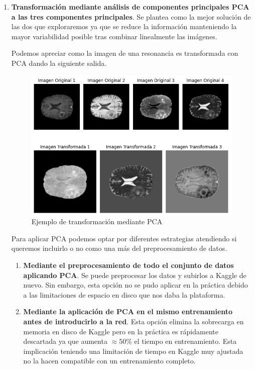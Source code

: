 \begin{enumerate}
	\item \textbf{Transformación mediante análisis de componentes principales PCA a las tres componentes principales}. Se plantea como la mejor solución de las dos que exploraremos ya que se reduce la información manteniendo la mayor variabilidad posible tras combinar linealmente las imágenes. 
	
	Podemos apreciar como la imagen de una resonancia es transformada con PCA dando la siguiente salida.
	
	\begin{figure}[H]
		\centering
		\includegraphics[width=0.8\linewidth]{imagenes/PCA_reduction.png}
		\caption{Ejemplo de transformación mediante PCA}
	\end{figure}
	
	Para aplicar PCA podemos optar por diferentes estrategias atendiendo si queremos incluirlo o no como una más del preprocesamiento de datos.
	
	\begin{enumerate}
		\item \textbf{Mediante el preprocesamiento de todo el conjunto de datos aplicando PCA}. Se puede preprocesar los datos y subirlos a Kaggle de nuevo. Sin embargo, esta opción no se pudo aplicar en la práctica debido a las limitaciones de espacio en disco que nos daba la plataforma.
		
		\item \textbf{Mediante la aplicación de PCA en el mismo entrenamiento antes de introducirlo a la red}. Esta opción elimina la sobrecarga en memoria en disco de Kaggle pero en la práctica es rápidamente descartada ya que aumenta $\approx 50 \%$ el tiempo en entrenamiento. Esta implicación teniendo una limitación de tiempo en Kaggle muy ajustada no la hacen compatible con un entrenamiento completo.
	\end{enumerate}
	

\end{enumerate}
